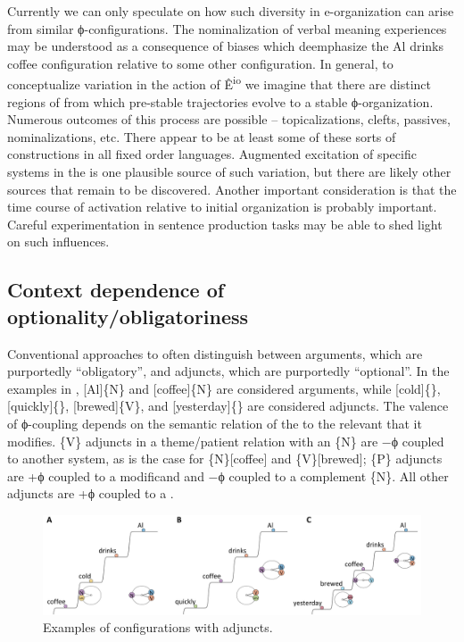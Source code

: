   Currently we can only speculate on how such diversity in e-organization can arise from similar ϕ-con\-fig\-u\-ra\-tions. The nominalization of verbal meaning experiences may be understood as a consequence of  biases which deemphasize the {\textbar}Al drinks coffee{\textbar} configuration relative to some other configuration. In general, to conceptualize variation in the action of Ê\textsuperscript{io} we imagine that there are distinct regions of  from which pre-stable trajectories evolve to a stable ϕ-organization. Numerous outcomes of this process are possible -- topicalizations, clefts, passives, nominalizations, etc. There appear to be at least some of these sorts of constructions in all fixed order languages. Augmented excitation of specific systems in the  is one plausible source of such variation, but there are likely other sources that remain to be discovered. Another important consideration is that the time course of activation relative to initial organization is probably important. Careful experimentation in sentence production tasks may be able to shed light on such influences.

\subsection{Context dependence of optionality/obligatoriness}

Conventional approaches to  often distinguish between arguments, which are purportedly “obligatory”, and adjuncts, which are purportedly “optional”. In the examples in {}, [Al]\{N\} and [coffee]\{N\} are considered arguments, while [cold]\{\}, [quickly]\{\}, [brewed]\{V\}, and [yesterday]\{\} are considered adjuncts. The valence of  ϕ-coupling depends on the semantic relation of the  to the relevant  that it modifies. \{V\} adjuncts in a theme/patient relation with an \{N\} are −ϕ coupled to another system, as is the case for \{N\}[coffee] and \{V\}[brewed]; \{P\} adjuncts are +ϕ coupled to a modificand and −ϕ coupled to a complement \{N\}. All other adjuncts are +ϕ coupled to a .

  
\begin{figure}
\includegraphics[width=\textwidth]{figures/Tilsen-img83.png}
\caption{Examples of configurations with adjuncts.}
\label{fig:4:33}
\end{figure}
 

